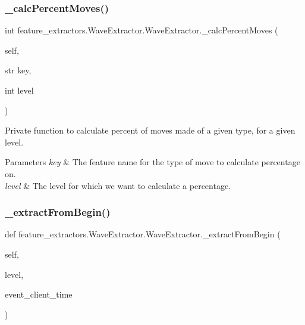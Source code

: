 \subsubsection{\texorpdfstring{\_calcPercentMoves()}{\_calcPercentMoves()}}
{\footnotesize\ttfamily  int feature\+\_\+extractors.\+Wave\+Extractor.\+Wave\+Extractor.\+\_\+calc\+Percent\+Moves (\begin{DoxyParamCaption}\item[{}]{self,  }\item[{str}]{key,  }\item[{int}]{level }\end{DoxyParamCaption})\hspace{0.3cm}{\ttfamily [private]}}



Private function to calculate percent of moves made of a given type, for a given level. 


\begin{DoxyParams}{Parameters}
{\em key} & The feature name for the type of move to calculate percentage on. \\
\hline
{\em level} & The level for which we want to calculate a percentage. \\
\hline
\end{DoxyParams}
\mbox{\label{classfeature__extractors_1_1_wave_extractor_1_1_wave_extractor_ae5c40040ef91149c3453ccccb50e82aa}} 
\subsubsection{\texorpdfstring{\_extractFromBegin()}{\_extractFromBegin()}}
{\footnotesize\ttfamily def feature\+\_\+extractors.\+Wave\+Extractor.\+Wave\+Extractor.\+\_\+extract\+From\+Begin (\begin{DoxyParamCaption}\item[{}]{self,  }\item[{}]{level,  }\item[{}]{event\+\_\+client\+\_\+time }\end{DoxyParamCaption})\hspace{0.3cm}{\ttfamily [private]}}



